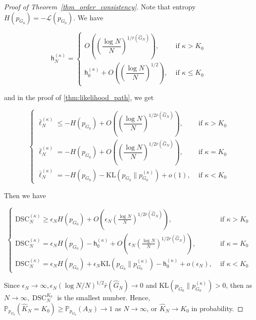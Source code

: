\documentclass[twoside]{article}
\newcommand{\height}{\mathsf{h}}
\theoremstyle{plain}
\theoremstyle{definition}
\theoremstyle{plain}
\begin{document}
\begin{proof}[Proof of Theorem~\ref{thm_order_consistency}]
    Note that entropy $H\left(p_{G_{0}}\right)=-\mathcal{L}\left(p_{G_{0}}\right)$. We have

$$
\height_{N}^{(\kappa)}= \begin{cases}O\left(\left(\dfrac{\log N}{N}\right)^{1 / \bar{r}\left(\widehat{G}_{N}\right)}\right), & \text { if } \kappa>K_{0} \\ \height_{0}^{(\kappa)}+O\left(\left(\dfrac{\log N}{N}\right)^{1 / 2}\right), & \text { if } \kappa \leq K_{0}\end{cases}
$$

and in the proof of \cref{thm:likelihood_path}, we get

$$
\begin{cases}\bar{\ell}_{N}^{(\kappa)} \leq-H\left(p_{G_{0}}\right)+O\left(\left(\dfrac{\log N}{N}\right)^{1 / 2 \bar{r}\left(\widehat{G}_{N}\right)}\right), & \text { if } \kappa>K_{0} \\ \bar{\ell}_{N}^{(\kappa)}=-H\left(p_{G_{0}}\right)+O\left(\left(\dfrac{\log N}{N}\right)^{1 / 2 \bar{r}\left(\widehat{G}_{N}\right)}\right), & \text { if } \kappa=K_{0} \\ \bar{\ell}_{N}^{(\kappa)}=-H\left(p_{G_{0}}\right)-\mathrm{KL}\left(p_{G_{0}} \| p_{G_{0}}^{(\kappa)}\right)+o(1), & \text { if } \kappa<K_{0}\end{cases}
$$

Then we have

$$
\begin{cases}\mathrm{DSC}_N^{(\kappa)} \geq \epsilon_N H\left(p_{G_{0}}\right)+O\left(\epsilon_N\left(\frac{\log N}{N}\right)^{1 / 2 \bar{r}\left(\widehat{G}_{N}\right)}\right), & \text { if } \kappa>K_{0} \\ \mathrm{DSC}_N^{(\kappa)}=\epsilon_N H\left(p_{G_{0}}\right)-\height_{0}^{(\kappa)}+O\left(\epsilon_N\left(\frac{\log N}{N}\right)^{1 / 2 \bar{r}\left(\widehat{G}_{N}\right)}\right), & \text { if } \kappa=K_{0} \\ \mathrm{DSC}_N^{(\kappa)}=\epsilon_N H\left(p_{G_{0}}\right)+\epsilon_N \mathrm{KL}\left(p_{G_{0}} \| p_{G_{0}}^{(\kappa)}\right)-\height_{0}^{(\kappa)}+o\left(\epsilon_N\right), & \text { if } \kappa<K_{0}\end{cases}
$$

Since $\epsilon_N \rightarrow \infty, \epsilon_N(\log N / N)^{1 / 2} \bar{r}\left(\widehat{G}_{N}\right) \rightarrow 0$ and $\mathrm{KL}\left(p_{G_{0}} \| p_{G_{0}}^{(\kappa)}\right)>0$, then as $N \rightarrow \infty, \operatorname{DSC}_{N}^{K_{0}}$ is the smallest number. Hence, $\mathbb{P}_{p_{G_{0}}}\left(\widehat{K}_{N}=K_{0}\right) \geq \mathbb{P}_{p_{G_{0}}}\left(A_{N}\right) \rightarrow 1$ as $N \rightarrow \infty$, or $\widehat{K}_{N} \rightarrow K_{0}$ in probability.
\end{proof}
\end{document}
